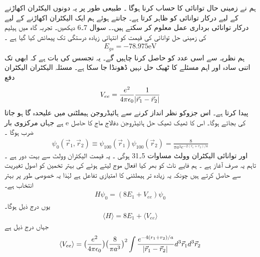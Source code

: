 ہم نے زمینی حال توانائی     کا حساب کرنا ہوگا ۔ طبیعی طور پر یہ دونوں الیکٹران اکھاڑنے کے لیے درکار توانائی کو ظاہر کرتا ہے۔      جانتے ہوئے ہم ایک الیکٹران اکھاڑنے کے لیے درکار توانائی برداری عمل معلوم کر سکتے ہیں۔۔
سوال 7۔6 دیکھیں۔ 
تجربہ گاہ میں ہیلیم کی زمینی حل توانائی کی قیمت کو انتہائی زیادہ درستگی تک پیمائش کیا گیا ہے ۔
\begin{align}
E_{gs}=-78.975 \text{eV} 
\end{align}
 ہم نظریہ سے اسی عدد کو حاصل کرنا چاہیں گے۔ یہ تجسس کی بات ہے کہ ابھی تک اتنی سادہ اور اہم مسئلے کا ٹھیک حل نہیں ڈھونڈا جا سکا ہے۔
مسئلہ الیکٹران الیکٹران دفع 
\begin{align}
V_{ee}=\frac{e^{2}}{4\pi\epsilon_{0}}\frac{1}{\abs{\vec{r}_{1}-\vec{r}_{2}}} 
\end{align}
 پیدا کرتا ہے۔ اس جزوکو نظر انداز کرنے سے   ہائیڈروجن ہیملٹنی میں علیحدہ گا ہو جاتا ہے جہاں  مرکزوی  بار e کی بجائے    ہوگا۔ اس کا ٹھیک ٹھیک حل ہائیڈروجن دفالاج ماج کا حاصل ضرب ہوگا ۔
\begin{align}
\psi_{0}(\vec{r}_{1},\vec{r}_{2})\equiv \psi_{100}(\vec{r}_{1})\psi_{100}(\vec{r}_{2})=\frac{8}{\pi a^{3}e^{-2(r_{1}+r_{2})/a}} 
\end{align}
 اور توانائی    الیکٹران وولٹ 
مساوات 5۔31 ہوگی ۔ یہ قیمت    الیکٹران وولٹ سے بہت دور ہے ۔ تاہم یہ صرف آغاز ہے ۔ ہم فایے ناٹ کو بھر کیا افعال موج لیتے ہوئے     کی بہتر تخمین کو اصول تغیریت سے حاصل کرتے ہیں چونکہ یہ زیادہ تر ہیملٹنی کا امتیازی تفاعل ہے لہٰذا یہ خصوصی طور پر بہتر انتخاب ہے۔
\begin{align}
H\psi_{0}=(8E_{1}+V_{ee})\psi_{0} 
\end{align}
 یوں درج ذیل ہوگا۔ 
\begin{align}
\langle H \rangle=8E_{1}+\langle V_{ee}\rangle
\end{align}
 جہاں درج ذیل ہے 
\begin{align}
\langle V_{ee}\rangle=\big(\frac{e^{2}}{4\pi\epsilon_{0}}\big )\big (\frac{8}{\pi a^{3}}\big )^{2}\int \frac{e^{-4(r_{1}+r_{2})/a}}{\abs{\vec{r}_{1}-\vec{r}_{2}}}d^{3}\vec{r}_{1}d^{3}\vec{r}_{2} 
\end{align}
 
